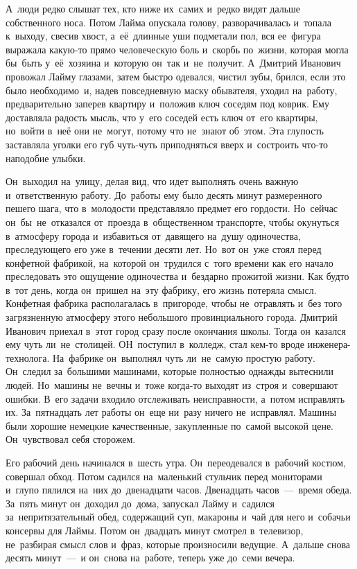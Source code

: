 А~люди редко слышат тех, кто ниже их~самих и~редко видят дальше собственного носа.
Потом Лайма опускала голову, разворачивалась и~топала к~выходу, свесив хвост, а~её~длинные уши подметали пол, вся ее~фигура выражала какую-то прямо человеческую боль и~скорбь по~жизни, которая могла бы~быть у~её~хозяина и~которую он~так и~не~получит.
А~Дмитрий Иванович провожал Лайму глазами, затем быстро одевался, чистил зубы, брился, если это было необходимо~и, надев повседневную маску обывателя, уходил на~работу, предварительно заперев квартиру и~положив ключ соседям под коврик.
Ему доставляла радость мысль, что у~его соседей есть ключ от~его квартиры, но~войти в~неё они не~могут, потому что не~знают об~этом.
Эта глупость заставляла уголки его губ чуть-чуть приподняться вверх и~состроить что-то наподобие улыбки.

Он~выходил на~улицу, делая вид, что идет выполнять очень важную и~ответственную работу.
До~работы ему было десять минут размеренного пешего шага, что в~молодости представляло предмет его гордости.
Но~сейчас он~бы~не~отказался от~проезда в~общественном транспорте, чтобы окунуться в~атмосферу города и~избавиться от~давящего на~душу одиночества, преследующего его уже в~течении десяти лет.
Но~вот он~уже стоял перед конфетной фабрикой, на~которой он~трудился с~того времени как его начало преследовать это ощущение одиночества и~бездарно прожитой жизни.
Как будто в~тот день, когда он~пришел на~эту фабрику, его жизнь потеряла смысл.
Конфетная фабрика располагалась в~пригороде, чтобы не~отравлять и~без того загрязненную атмосферу этого небольшого провинциального города.
Дмитрий Иванович приехал в~этот город сразу после окончания школы.
Тогда он~казался ему чуть ли~не~столицей.
ОН~поступил в~колледж, стал кем-то вроде инженера-технолога.
На~фабрике он~выполнял чуть ли~не~самую простую работу.
Он~следил за~большими машинами, которые полностью однажды вытеснили людей.
Но~машины не~вечны и~тоже когда-то выходят из~строя и~совершают ошибки.
В~его задачи входило отслеживать неисправности, а~потом исправлять их.
За~пятнадцать лет работы он~еще ни~разу ничего не~исправлял.
Машины были хорошие немецкие качественные, закупленные по~самой высокой цене.
Он~чувствовал себя сторожем.

Его рабочий день начинался в~шесть утра.
Он~переодевался в~рабочий костюм, совершал обход.
Потом садился на~маленький стульчик перед мониторами и~глупо пялился на~них до~двенадцати часов.
Двенадцать часов~---~время обеда.
За~пять минут он~доходил до~дома, запускал Лайму и~садился за~непритязательный обед, содержащий суп, макароны и~чай для него и~собачьи консервы для Лаймы.
Потом он~двадцать минут смотрел в~телевизор, не~разбирая смысл слов и~фраз, которые произносили ведущие.
А~дальше снова десять минут~---~и он~снова на~работе, теперь уже до~семи вечера.

